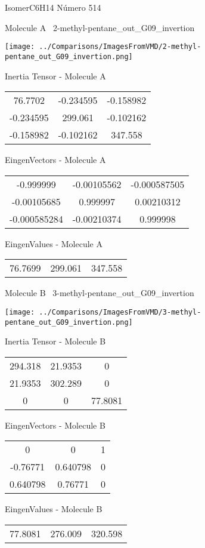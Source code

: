 \vtab[-3cm]
\begin{center}
{\large IsomerC6H14 \tab Número 514}
\end{center}
\begin{multicols}{2}
\begin{center}

Molecule A \
2-methyl-pentane\_out\_G09\_invertion

\texttt{[image: ../Comparisons/ImagesFromVMD/2-methyl-pentane\_out\_G09\_invertion.png]}

Inertia Tensor - Molecule A \\
\begin{tabular}{|c c c|}
76.7702	 & 	-0.234595	 & 	-0.158982	 \\
-0.234595	 & 	299.061	 & 	-0.102162	 \\
-0.158982	 & 	-0.102162	 & 	347.558
\end{tabular}

\vtab
 EingenVectors - Molecule A     \\
\begin{tabular}{|c c c|}
-0.999999	 & 	-0.00105562	 & 	-0.000587505	 \\
-0.00105685	 & 	0.999997	 & 	0.00210312	 \\
-0.000585284	 & 	-0.00210374	 & 	0.999998
\end{tabular}

\vtab
 EingenValues - Molecule A     \\
\begin{tabular}{|c c c|}
76.7699	 & 	299.061	 & 	347.558	 \\
\end{tabular}
\columnbreak

Molecule B \
3-methyl-pentane\_out\_G09\_invertion

\texttt{[image: ../Comparisons/ImagesFromVMD/3-methyl-pentane\_out\_G09\_invertion.png]}

Inertia Tensor - Molecule B \\
\begin{tabular}{|c c c|}
294.318	 & 	21.9353	 & 	0	 \\
21.9353	 & 	302.289	 & 	0	 \\
0	 & 	0	 & 	77.8081
\end{tabular}

\vtab
 EingenVectors - Molecule B     \\
\begin{tabular}{|c c c|}
0	 & 	0	 & 	1	 \\
-0.76771	 & 	0.640798	 & 	0	 \\
0.640798	 & 	0.76771	 & 	0
\end{tabular}

\vtab
 EingenValues - Molecule B     \\
\begin{tabular}{|c c c|}
77.8081	 & 	276.009	 & 	320.598	 \\
\end{tabular}

\end{center}
\end{multicols}

